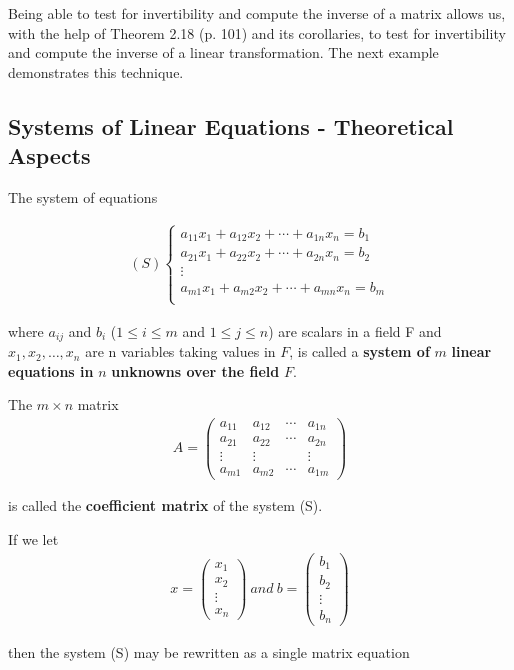 \documentclass{article}
\newcommand{\bd}[1]{\textbf{#1}}
\newcommand*\bpmat[0]{\begin{pmatrix}}
\newcommand*\epmat[0]{\end{pmatrix}}
\theoremstyle{plain}
\theoremstyle{plain} %
\begin{document}
Being able to test for invertibility and compute the inverse of a matrix allows us, with the help of Theorem 2.18 (p. 101) and its corollaries, to test for invertibility and compute the inverse of a linear transformation. The next example demonstrates this technique.

\subsection{Systems of Linear Equations - Theoretical Aspects}

The system of equations

\begin{align*}
  (S)
\begin{cases}
  a_{11}x_1+a_{12}x_2+\cdots+a_{1n}x_n=b_1\\
  a_{21}x_1+a_{22}x_2+\cdots+a_{2n}x_n=b_2\\
  \vdots\\
  a_{m1}x_1+a_{m2}x_2+\cdots+a_{mn}x_n=b_m\\
\end{cases}
\end{align*}

where $a_{ij}$ and $b_i$ ($1 \leq i \leq m$ and $1 \leq j \leq n$) are scalars in a field F and $x_1, x_2,\ldots,x_n$ are n variables taking values in $F$, is called a \bd{system of} $m$ \bd{linear equations in} $n$ \bd{unknowns over the field} $F$.

The $m \times n$ matrix
\begin{align*}
  A=\bpmat
  a_{11}&a_{12}&\cdots&a_{1n}\\
  a_{21}&a_{22}&\cdots&a_{2n}\\
  \vdots&\vdots&&\vdots\\
  a_{m1}&a_{m2}&\cdots&a_{1m}
  \epmat
\end{align*}

is called the \bd{coefficient matrix} of the system (S).

If we let
\begin{align*}
  x=\bpmat x_1\\x_2\\\vdots\\x_n\epmat~and~b=\bpmat b_1\\b_2\\\vdots\\b_n\epmat
\end{align*}

then the system (S) may be rewritten as a single matrix equation
\end{document}
